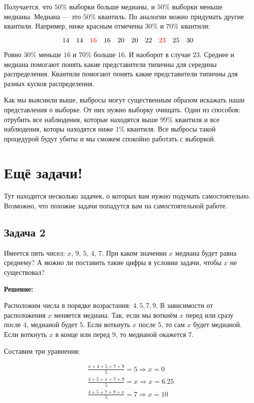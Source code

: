 \documentclass[12pt, a4paper, oneside]{article}
\begin{document}
\begin{enumerate}
	Получается, что $50\%$ выборки больше медианы, и $50\%$ выборки меньше медианы. Медиана --- это $50\%$ квантиль. По аналогии можно придумать другие квантили. Например, ниже красным отмечены $30\%$ и $70\%$ квантили: 
	
	\[
	14 \quad 14  \quad {\color{red}16 } \quad 16  \quad 20  \quad 20  \quad 22  \quad {\color{red}{23}}  \quad 25  \quad 30
	\]
	
	Ровно $30\%$ меньше $16$ и $70\%$ больше $16$. И наоборот в случае $23$. Среднее и медиана помогают понять какие представители типичны для середины распределения. Квантили помогают понять какие представители типичны для разных кусков распределения. 

	Как мы выяснили выше, выбросы могут существенным образом искажать наши представления о выборке. От них нужно выборку очищать. Один из способов: отрубить все наблюдения, которые находятся выше $99\%$ квантиля и все наблюдения, которы находятся ниже $1\%$ квантиля. Все выбросы такой процедурой будут убиты и мы сможем спокойно работать с выборкой. 

\end{enumerate}


\section*{Ещё задачи!} 

Тут находится несколько задачек, о которых вам нужно подумать самостоятельно.  Возможно, что похожие задачи попадутся вам на самостоятельной работе. 

\subsection*{Задача 2}

Имеется пять чисел: $x$, $9$, $5$, $4$, $7$. При каком значении $x$ медиана будет равна среднему? А можно ли поставить такие цифры в условии задачи, чтобы $x$ не существовал?

\textbf{Решение:} 

Расположим числа в порядке возрастания: $4,5,7,9$. В зависимости от расположения $x$ меняется медиана. Так, если мы воткнём $x$ перед или сразу после $4$, медианой будет $5$. Если воткнуть $x$ после $5$, то сам $x$ будет медианой. Если воткнуть $x$ в конце или перед $9$, то медианой окажется $7$. 

Составим три уравнения: 

\begin{equation*} 
\begin{aligned}
& \frac{x + 4 + 5 + 7 + 9}{5} = 5 \Rightarrow x = 0 \\
& \frac{4 + 5 + x + 7 + 9}{5} = x \Rightarrow x = 6.25 \\
& \frac{4 + 5 + 7 + 9 + x}{5} = 7 \Rightarrow x = 10 \\
\end{aligned}
\end{equation*}
\end{document}
